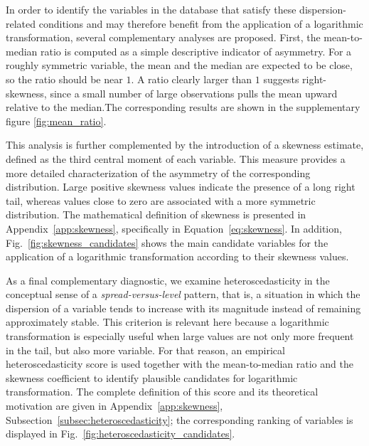 In order to identify the variables in the database that satisfy these dispersion-related conditions and may therefore benefit from the application of a logarithmic transformation, several complementary analyses are proposed. First, the mean-to-median ratio is computed as a simple descriptive indicator of asymmetry. For a roughly symmetric variable, the mean and the median are expected to be close, so the ratio should be near \(1\). A ratio clearly larger than \(1\) suggests right-skewness, since a small number of large observations pulls the mean upward relative to the median.The corresponding results are shown in the supplementary figure \ref{fig:mean_ratio}.

This analysis is further complemented by the introduction of a skewness estimate, defined as the third central moment of each variable. This measure provides a more detailed characterization of the asymmetry of the corresponding distribution. Large positive skewness values indicate the presence of a long right tail, whereas values close to zero are associated with a more symmetric distribution. The mathematical definition of skewness is presented in Appendix~\ref{app:skewness}, specifically in Equation~\eqref{eq:skewness}. In addition, Fig.~\ref{fig:skewness_candidates} shows the main candidate variables for the application of a logarithmic transformation according to their skewness values.

As a final complementary diagnostic, we examine heteroscedasticity in the conceptual sense of a \emph{spread-versus-level} pattern, that is, a situation in which the dispersion of a variable tends to increase with its magnitude instead of remaining approximately stable. This criterion is relevant here because a logarithmic transformation is especially useful when large values are not only more frequent in the tail, but also more variable. For that reason, an empirical heteroscedasticity score is used together with the mean-to-median ratio and the skewness coefficient to identify plausible candidates for logarithmic transformation. The complete definition of this score and its theoretical motivation are given in Appendix~\ref{app:skewness}, Subsection~\ref{subsec:heteroscedasticity}; the corresponding ranking of variables is displayed in Fig.~\ref{fig:heteroscedasticity_candidates}.

